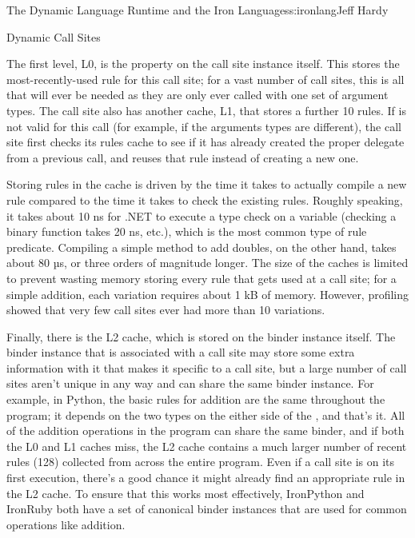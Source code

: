 \begin{aosachapter}{The Dynamic Language Runtime and the Iron Languages}{s:ironlang}{Jeff Hardy}
\begin{aosasect1}{Dynamic Call Sites}

The first level, L0, is the  property on the call site
instance itself. This stores the most-recently-used rule for this call site;
for a vast number of call sites, this is all that will ever be needed as they
are only ever called with one set of argument types. The call site also has
another cache, L1, that stores a further 10 rules. If  is not
valid for this call (for example, if the arguments types are different), the
call site first checks its rules cache to see if it has already created the
proper delegate from a previous call, and reuses that rule instead of creating
a new one.

Storing rules in the cache is driven by the time it takes to actually compile a
new rule compared to the time it takes to check the existing rules. Roughly
speaking, it takes about 10 ns for .NET to execute a type check on a variable
(checking a binary function takes 20 ns, etc.), which is the most common type
of rule predicate. Compiling a simple method to add doubles, on the other hand,
takes about 80 µs, or three orders of magnitude longer. The size of the caches
is limited to prevent wasting memory storing every rule that gets used at a
call site; for a simple addition, each variation requires about 1 kB of memory.
However, profiling showed that very few call sites ever had more than 10
variations.

Finally, there is the L2 cache, which is stored on the binder instance itself.
The binder instance that is associated with a call site may store some extra
information with it that makes it specific to a call site, but a large number
of call sites aren't unique in any way and can share the same binder instance.
For example, in Python, the basic rules for addition are the same throughout
the program; it depends on the two types on the either side of the \code{+},
and that's it. All of the addition operations in the program can share the same
binder, and if both the L0 and L1 caches miss, the L2 cache contains a much
larger number of recent rules (128) collected from across the entire program.
Even if a call site is on its first execution, there's a good chance it might
already find an appropriate rule in the L2 cache. To ensure that this works
most effectively, IronPython and IronRuby both have a set of canonical binder
instances that are used for common operations like addition.


\end{aosasect1}
\end{aosachapter}
